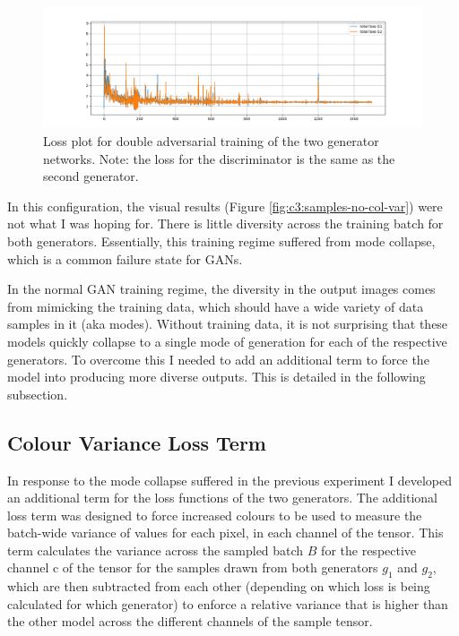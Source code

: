   \begin{figure}[!htbp]
    \centering
    \includegraphics[width=1\textwidth]{figures/c4_unstable/train_losses/no_col_var/total_loss_no_var.png}
    \caption[Loss plot for double adversarial training]{Loss plot for double adversarial training of the two generator networks. Note: the loss for the discriminator is the same as the second generator.}
  \label{fig:c3:no-var-losses}
  \end{figure}

In this configuration, the visual results (Figure \ref{fig:c3:samples-no-col-var}) were not what I was hoping for.  
There is little diversity across the training batch for both generators. 
Essentially, this training regime suffered from mode collapse, which is a common failure state for GANs.

In the normal GAN training regime, the diversity in the output images comes from mimicking the training data, which should have a wide variety of data samples in it (aka modes). 
Without training data, it is not surprising that these models quickly collapse to a single mode of generation for each of the respective generators. 
To overcome this I needed to add an additional term to force the model into producing more diverse outputs. 
This is detailed in the following subsection.

\subsection{Colour Variance Loss Term}

In response to the mode collapse suffered in the previous experiment I developed an additional term for the loss functions of the two generators.
The additional loss term was designed to force increased colours to be used to measure the batch-wide variance of values for each pixel, in each channel of the tensor. 
This term calculates the variance across the sampled batch $B$ for the respective channel c of the tensor for the samples drawn from both generators $g_{1}$ and $g_{2}$, which are then subtracted from each other (depending on which loss is being calculated for which generator) to enforce a relative variance that is higher than the other model across the different channels of the sample tensor.

